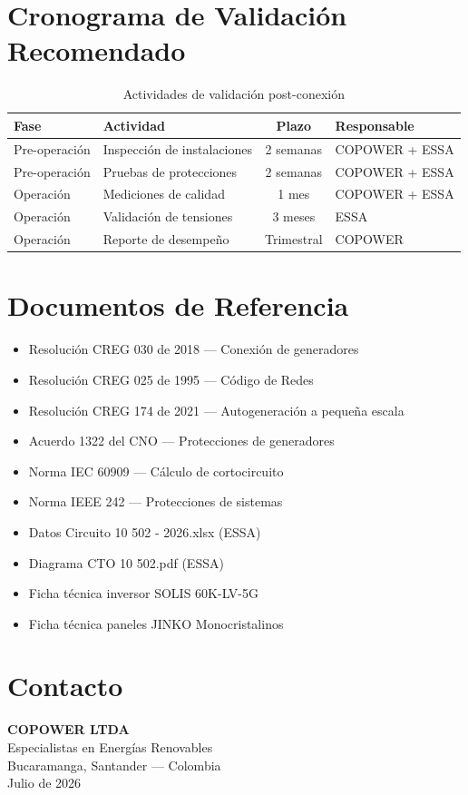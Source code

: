 \section{Cronograma de Validación Recomendado}

\begin{table}[H]
    \centering
    \caption{Actividades de validación post-conexión}
    \begin{tabular}{llcl}
    \toprule
    \textbf{Fase} & \textbf{Actividad} & \textbf{Plazo} & \textbf{Responsable} \\
    \midrule
    Pre-operación & Inspección de instalaciones & 2 semanas & COPOWER + ESSA \\
    Pre-operación & Pruebas de protecciones & 2 semanas & COPOWER + ESSA \\
    Operación & Mediciones de calidad & 1 mes & COPOWER + ESSA \\
    Operación & Validación de tensiones & 3 meses & ESSA \\
    Operación & Reporte de desempeño & Trimestral & COPOWER \\
    \bottomrule
    \end{tabular}
\end{table}

\section{Documentos de Referencia}

\begin{itemize}
    \item Resolución CREG 030 de 2018 --- Conexión de generadores
    \item Resolución CREG 025 de 1995 --- Código de Redes
    \item Resolución CREG 174 de 2021 --- Autogeneración a pequeña escala
    \item Acuerdo 1322 del CNO --- Protecciones de generadores
    \item Norma IEC 60909 --- Cálculo de cortocircuito
    \item Norma IEEE 242 --- Protecciones de sistemas
    \item Datos Circuito 10 502 - 2026.xlsx (ESSA)
    \item Diagrama CTO 10 502.pdf (ESSA)
    \item Ficha técnica inversor SOLIS 60K-LV-5G
    \item Ficha técnica paneles JINKO Monocristalinos
\end{itemize}

\section{Contacto}

\begin{center}
    \textbf{COPOWER LTDA} \\
    Especialistas en Energías Renovables \\
    Bucaramanga, Santander --- Colombia \\
    Julio de 2026
\end{center}
